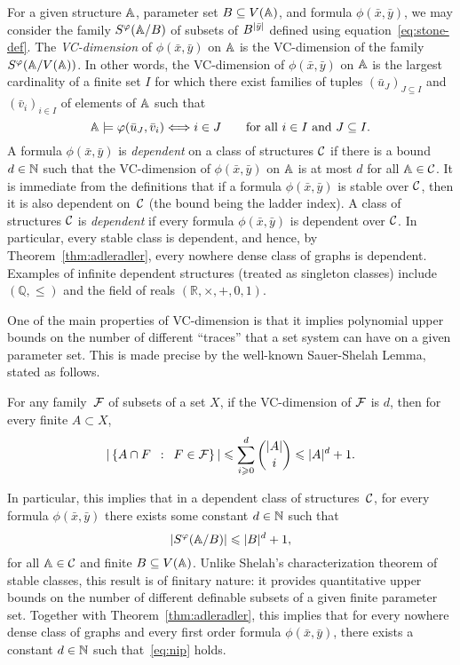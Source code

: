 For a given structure $\str A$, parameter set $B\subseteq V(\str A)$, and formula $\phi(\bar x,\bar y)$,
we may consider the family $S^\phi(\str A/B)$ of subsets of $B^{|\tup y|}$ defined using equation~\eqref{eq:stone-def}.
The \emph{VC-dimension} of $\phi(\bar x,\bar y)$ on $\str A$ is the VC-dimension of the family $S^\phi(\str A/V(\str A))$. 
In other words, the VC-dimension of $\phi(\bar x,\bar y)$
on $\str A$ is the largest cardinality of a finite
set $I$ for which there exist families of tuples $(\bar u_J)_{J\subseteq I}$ and $(\bar v_i)_{i\in I}$
of elements of $\str A$
such that  $$\strA\models\phi(\tup{u}_J,\tup{v}_i)\Longleftrightarrow i\in J\qquad \text {for all $i\in I$ and $J\subset I$.}$$
A formula $\phi(\bar x,\bar y)$ is \emph{dependent} on a class of structures $\cal C$
if there is a bound $d\in\N$ such that the VC-dimension of $\phi(\bar x,\bar y)$ on $\str A$ is at most $d$ for all $\str A\in\cal C$.
It is immediate from the definitions  that if a formula $\phi(\bar x,\bar y)$ is stable over $\cal C$, then it is also dependent on~$\cal C$ (the bound being the ladder index). 
A class of structures  $\cal C$ is {\em{dependent}} if every formula $\phi(\bar x,\bar y)$ is dependent over $\cal C$. 
In particular, every stable class is dependent, and hence, by Theorem~\ref{thm:adleradler}, every nowhere dense class of graphs is dependent.
Examples of infinite dependent structures (treated as singleton classes) include 
$(\mathbb Q,\le )$ and the field of reals $(\mathbb R,\times,+,0,1)$. 

One of the main properties of VC-dimension is that it implies polynomial upper bounds on the number of different ``traces'' that a set system can have on a given parameter set.
This is made precise by the well-known Sauer-Shelah Lemma, stated as follows.
\begin{theorem}\label{thm:sauer-shelah}
  For any family~$\FFF$ of subsets of a set $X$, if the VC-dimension of $\FFF$ is $d$,
  then for every finite $A\subset X$,
\[|\setof{A\cap F}{F\in {\cal F}}|\le \sum_{i\geq 0}^d \binom{|A|}{i}\leq |A|^d+1.\] 
\end{theorem}
In particular, this implies that 
in a dependent class of structures~$\cal C$, 
for every formula $\phi(\bar x,\bar y)$
there exists some constant $d\in \N$
such that
\begin{equation}\label{eq:nip}
|S^\phi(\str A/B)|\le |B|^d+1,	
\end{equation}
for all $\str A\in\cal C$ and finite $B\subset V(\str A)$.
Unlike Shelah's characterization theorem of stable classes, this result 
is of finitary nature: it provides quantitative upper bounds on the number of different definable subsets of a given finite parameter set. 
Together with Theorem~\ref{thm:adleradler}, this implies that for every nowhere dense class of graphs %
and every first order formula $\phi(\bar x,\bar y)$,
there exists a constant \mbox{$d\in\N$} such that~\eqref{eq:nip} holds. 

